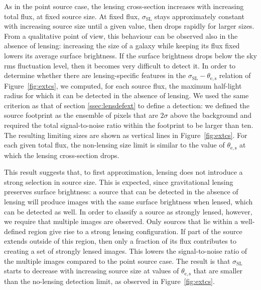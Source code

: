 \documentclass{aa}
\def\crosssect{\sigma_\mathrm{{SL}}}
\def\Fref#1{Figure~\ref{#1}\xspace}
\begin{document}

As in the point source case, the lensing cross-section increases with increasing total flux, at fixed source size.
At fixed flux, $\crosssect$ stays approximately constant with increasing source size until a given value, then drops rapidly for larger sizes.
From a qualitative point of view, this behaviour can be observed also in the absence of lensing: increasing the size of a galaxy while keeping its flux fixed lowers its average surface brightness. If the surface brightness drops below the sky rms fluctuation level, then it becomes very difficult to detect it.
In order to determine whether there are lensing-specific features in the $\crosssect-\theta_{\mathrm{e,s}}$ relation of \Fref{fig:extcs}, we computed, for each source flux, the maximum half-light radius for which it can be detected in the absence of lensing.
We used the same criterion as that of section \ref{ssec:lensdefext} to define a detection: we defined the source footprint as the ensemble of pixels that are $2\sigma$ above the background and required the total signal-to-noise ratio within the footprint to be larger than ten.
The resulting limiting sizes are shown as vertical lines in \Fref{fig:extcs}. For each given total flux, the non-lensing size limit is similar to the value of $\theta_{\mathrm{e,s}}$ at which the lensing cross-section drops.

This result suggests that, to first approximation, lensing does not introduce a strong selection in source size.
This is expected, since gravitational lensing preserves surface brightness: a source that can be detected in the absence of lensing will produce images with the same surface brightness when lensed, which can be detected as well.
In order to classify a source as strongly lensed, however, we require that multiple images are observed. 
Only sources that lie within a well-defined region give rise to a strong lensing configuration.
If part of the source extends outside of this region, then only a fraction of its flux contributes to creating a set of strongly lensed images.
This lowers the signal-to-noise ratio of the multiple images compared to the point source case.
The result is that $\crosssect$ starts to decrease with increasing source size at values of $\theta_{\mathrm{e,s}}$ that are smaller than the no-lensing detection limit, as observed in \Fref{fig:extcs}.
\end{document}

